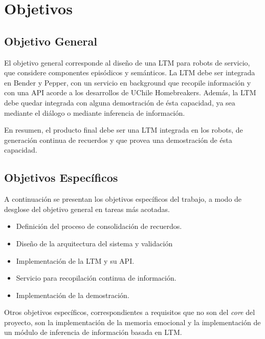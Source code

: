 

%
%

\section{Objetivos}

\subsection{Objetivo General}

El objetivo general corresponde al dise\~no de una LTM para robots de servicio, que considere componentes epis\'odicos y sem\'anticos. La LTM debe ser integrada en Bender y Pepper, con un servicio en background que recopile informaci\'on y con una API acorde a los desarrollos de UChile Homebreakers. Adem\'as, la LTM debe quedar integrada con alguna demostraci\'on de \'esta capacidad, ya sea mediante el di\'alogo o mediante inferencia de informaci\'on.

En resumen, el producto final debe ser una LTM integrada en los robots, de generaci\'on continua de recuerdos y que provea una demostraci\'on de \'esta capacidad.


\subsection{Objetivos Espec\'ificos}

A continuaci\'on se presentan los objetivos espec\'ificos del trabajo, a modo de desglose del objetivo general en tareas m\'as acotadas.

\begin{itemize}
\item Definici\'on del proceso de consolidaci\'on de recuerdos.
\item Dise\~no de la arquitectura del sistema y validaci\'on
\item Implementaci\'on de la LTM y su API.
\item Servicio para recopilaci\'on continua de informaci\'on.
\item Implementaci\'on de la demostraci\'on.
\end{itemize}

Otros objetivos espec\'ificos, correspondientes a requisitos que no son del \textit{core} del proyecto, son la implementaci\'on de la memoria emocional y la implementaci\'on de un m\'odulo de inferencia de informaci\'on basada en LTM.


%
%
